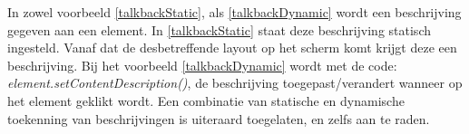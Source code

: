 



In zowel voorbeeld \ref{talkbackStatic}, als \ref{talkbackDynamic} wordt een beschrijving gegeven aan een element. In \ref{talkbackStatic} staat deze beschrijving statisch ingesteld. Vanaf dat de desbetreffende layout op het scherm komt krijgt deze een beschrijving. Bij het voorbeeld \ref{talkbackDynamic} wordt met de code: \emph{element.setContentDescription()}, de beschrijving toegepast/verandert wanneer op het element geklikt wordt. Een combinatie van statische en dynamische toekenning van beschrijvingen is uiteraard toegelaten, en zelfs aan te raden.

